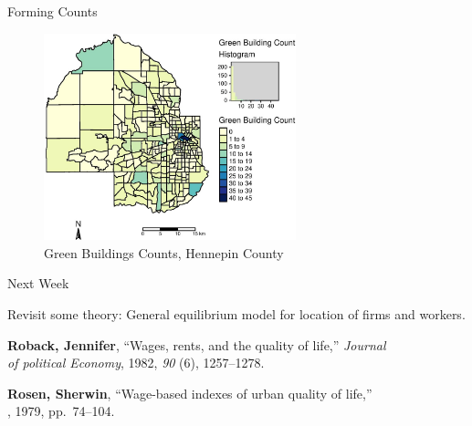 \documentclass[11pt]{beamer}
\begin{document}
\begin{frame}{Forming Counts}

\begin{figure}
	\caption{Green Buildings Counts, Hennepin County}
	\includegraphics[width = 0.65\textwidth]{hCounts.jpg}
\end{figure}

\end{frame}


\begin{frame}{Next Week}

Revisit some theory: General equilibrium model for location of firms and workers.
\bigskip

{\bf Roback, Jennifer}, ``Wages, rents, and the quality of life,'' {\it Journal\\
 \quad of political Economy}, 1982, {\it 90} (6), 1257--1278.

\bigskip
{\bf Rosen, Sherwin}, ``Wage-based indexes of urban quality of life,'' \\
, 1979, pp.~74--104.

\end{frame}


%
%
\end{document}
